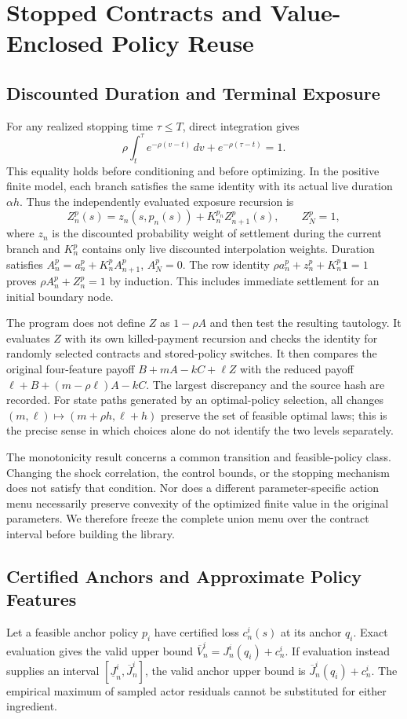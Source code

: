 \section{Stopped Contracts and Value-Enclosed Policy Reuse}
\subsection{Discounted Duration and Terminal Exposure}
For any realized stopping time $\tau\leq T$, direct integration gives
\[
 \rho\int_t^\tau e^{-\rho(v-t)}\,dv+e^{-\rho(\tau-t)}=1.
\]
This equality holds before conditioning and before optimizing. In the positive finite model, each branch satisfies the same identity with its actual live duration $\alpha h$. Thus the independently evaluated exposure recursion is
\[
 Z_n^p(s)=z_n(s,p_n(s))+K_n^{p_n}Z_{n+1}^p(s),\qquad Z_N^p=1,
\]
where $z_n$ is the discounted probability weight of settlement during the current branch and $K_n^p$ contains only live discounted interpolation weights. Duration satisfies $A_n^p=a_n^p+K_n^pA_{n+1}^p$, $A_N^p=0$. The row identity $\rho a_n^p+z_n^p+K_n^p\mathbf1=1$ proves $\rho A_n^p+Z_n^p=1$ by induction. This includes immediate settlement for an initial boundary node.

The program does not define $Z$ as $1-\rho A$ and then test the resulting tautology. It evaluates $Z$ with its own killed-payment recursion and checks the identity for randomly selected contracts and stored-policy switches. It then compares the original four-feature payoff $B+mA-kC+\ell Z$ with the reduced payoff $\ell+B+(m-\rho\ell)A-kC$. The largest discrepancy and the source hash are recorded. For state paths generated by an optimal-policy selection, all changes $(m,\ell)\mapsto(m+\rho h,\ell+h)$ preserve the set of feasible optimal laws; this is the precise sense in which choices alone do not identify the two levels separately.

The monotonicity result concerns a common transition and feasible-policy class. Changing the shock correlation, the control bounds, or the stopping mechanism does not satisfy that condition. Nor does a different parameter-specific action menu necessarily preserve convexity of the optimized finite value in the original parameters. We therefore freeze the complete union menu over the contract interval before building the library.

\subsection{Certified Anchors and Approximate Policy Features}
Let a feasible anchor policy $p_i$ have certified loss $c^i_n(s)$ at its anchor $q_i$. Exact evaluation gives the valid upper bound $\overline V^i_n=J^i_n(q_i)+c^i_n$. If evaluation instead supplies an interval $[\underline J^i_n,\overline J^i_n]$, the valid anchor upper bound is $\overline J^i_n(q_i)+c^i_n$. The empirical maximum of sampled actor residuals cannot be substituted for either ingredient.

